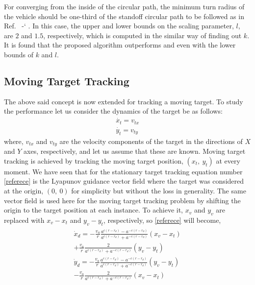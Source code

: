 \documentclass[Afour,sagev,times]{sagej}
\newcommand*{\citen}[1]{%
  \begingroup
    \romannumeral-`\x %
    \setcitestyle{numbers}%
    \cite{#1}%
  \endgroup   
}
\begin{document}
For converging from the inside of the circular path, the minimum turn radius of the vehicle should be one-third of the standoff circular path to be followed as in Ref.~\citen{pothen2017curvature}. In this case, the upper and lower bounds on the scaling parameter, $l$, are $2$ and $1.5$, respectively, which is computed in the similar way of finding out $k$. It is found that the proposed algorithm outperforms \cite{pothen2017curvature} and \cite{lawrence2003lyapunov} even with the lower bounds of $k$ and $l$.  

\subsection{Moving Target Tracking}

The above said concept is now extended for tracking a moving target.  To study the performance let us consider the dynamics of the target be as follows:
\begin{equation}\label{eq78}
\begin{split}
\dot{x_t}  = v_{tx}\\
\dot{y_t}  = v_{ty}
\end{split}
\end{equation}
 where, $v_{tx}$ and $v_{ty}$ are the velocity components of the target in the directions of $X$ and $Y$ axes, respectively, and let us assume that these are known. Moving target tracking is achieved by tracking the moving target position, $(x_t,~  y_t)$ at every moment. We have seen that for the stationary target tracking equation number \eqref{referece} is the Lyapunov guidance vector field where the target was considered at the origin, $(0,~0)$ for simplicity but without the loss in generality. The same vector field is used here for the moving target tracking problem by shifting the origin to the target position at each instance. To achieve it,  $x_v$ and $y_v$ are replaced with $x_v-x_t$ and $y_v-y_t$, respectively, so \eqref{referece} will become,
 \begin{multline}\label{referece1}
\begin{aligned}
\dot{x}_{d}  =  - \frac{v_{a}}{r}\frac{{{a^{c(r - {r_d})}} - {a^{ - c(r - {r_d})}}}}{{{a^{c(r - {r_d})}}+ {a^{ - c(r - {r_d})}}}}(x_v-x_t) \\+\frac{v_{a}}{r}\frac{2}{{{a^{c(r - {r_d})}} + {a^{ - c(r - {r_d})}}}}(y_v-y_t) \\  \dot{y}_{d}  =  - \frac{v_{a}}{r}\frac{{{a^{c(r - {r_d})}} - {a^{ - c(r - {r_d})}}}}{{{a^{c(r - {r_d})}} + {a^{ - c(r - {r_d})}}}}(y_v-y_t) \\- \frac{v_{a}}{r}\frac{2}{{{a^{c(r - {r_d})}} + {a^{ - c(r - {r_d})}}}}(x_v-x_t)
\end{aligned}
\end{multline}
\end{document}
